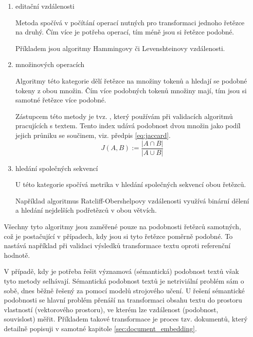 \documentclass[thesis=M,czech]{FITthesis}[2019/12/23]
\begin{document}
\begin{enumerate}
    \item editační vzdálenosti
    
    Metoda spočívá v počítání operací nutných pro transformaci jednoho řetězce na druhý. Čím více je potřeba operací, tím méně jsou si řetězce podobné.
    
    Příkladem jsou algoritmy Hammingovy či Levenshteinovy vzdálenosti.
    \newpage
    
    \item množinových operacích
    
    Algoritmy této kategorie dělí řetězce na množiny tokenů a hledají se podobné tokeny z obou množin. Čím více podobných tokenů množiny mají, tím jsou si samotné řetězce více podobné.
    
    Zástupcem této metody je tvz. , který používám při validacích algoritmů pracujících s textem. Tento index udává podobnost dvou množin jako podíl jejich průniku se součinem, viz. předpis \ref{eq:jaccard}.
    \begin{equation} \label{eq:jaccard}
    J(A,B) := \frac{|A \cap B|}{|A \cup B|}
    \end{equation}
    
    \item hledání společných sekvencí
    
    U této kategorie spočívá metrika v hledání společných sekvencí obou řetězců.
    
    Například algoritmus Ratcliff-Obershelpovy vzdálenosti využívá binární dělení a hledání nejdelších podřetězců v obou větvích.
    
\end{enumerate}

Všechny tyto algoritmy jsou zaměřené pouze na podobnosti řetězců samotných, což je postačující v případech, kdy jsou si tyto řetězce poměrně podobné. To nastává například při validaci výsledků transformace textu oproti referenční hodnotě.

V případě, kdy je potřeba řešit významová (sémantická) podobnost textů však tyto metody selhávají. Sémantická podobnost textů je netriviální problém sám o sobě, dnes běžně řešený za pomocí modelů strojového učení. U řešení sémantické podobnosti se hlavní problém přenáší na transformaci obsahu textu do prostoru vlastností (vektorového prostoru), ve kterém lze vzdálenost (podobnost, souvislost) měřit. Příkladem takové transformace je proces tzv.  dokumentů, který detailně popisuji v samotné kapitole \ref{sec:document_embedding}.
\end{document}
